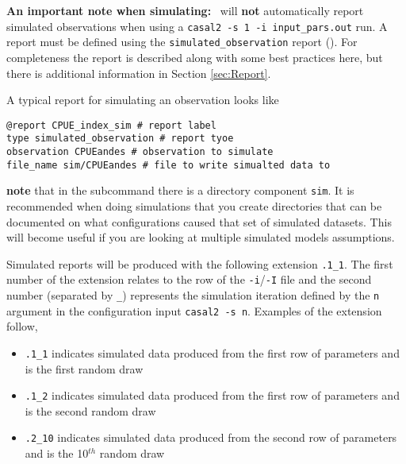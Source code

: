 \textbf{An important note when simulating:} \CNAME\ will \textbf{not} automatically report simulated observations when using a \texttt{casal2 -s 1 -i input\_pars.out} run. A report must be defined using the \texttt{simulated\_observation} report (). For completeness the report is described along with some best practices here, but there is additional information in Section \ref{sec:Report}.


A typical report for simulating an observation looks like
\begin{verbatim}
@report CPUE_index_sim # report label
type simulated_observation # report tyoe
observation CPUEandes # observation to simulate
file_name sim/CPUEandes # file to write simualted data to
\end{verbatim}
%
\textbf{note} that in the subcommand  there is a directory component \texttt{sim}. It is recommended when doing simulations that you create directories that can be documented on what configurations caused that set of simulated datasets. This will become useful if you are looking at multiple simulated models assumptions.


Simulated reports will be produced with the following extension \texttt{.1\_1}. The first number of the extension relates to the row of the \texttt{-i}/\texttt{-I} file and the second number (separated by \texttt{\_}) represents the simulation iteration defined by the \texttt{n} argument in the configuration input \texttt{casal2 -s n}. Examples of the extension follow,
\begin{itemize}
	\item \texttt{.1\_1} indicates simulated data produced from the first row of parameters and is the first random draw
	\item \texttt{.1\_2} indicates simulated data produced from the first row of parameters and is the second random draw
	\item \texttt{.2\_10} indicates simulated data produced from the second row of parameters and is the 10\(^{th}\) random draw
\end{itemize}




